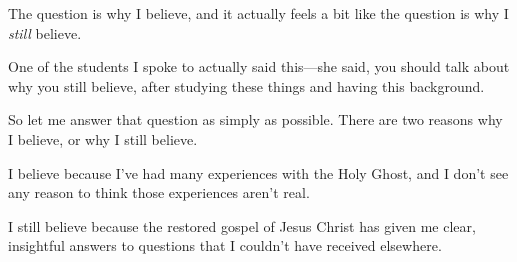 \begin{compactitem}
			\item The question is why I believe, and it actually feels a bit like the question is why I \textit{still} believe.
				\begin{compactitem}
					\item One of the students I spoke to actually said this---she said, you should talk about why you still believe, after studying these things and having this background.
					\item So let me answer that question as simply as possible. There are two reasons why I believe, or why I still believe.
					\item I believe because I've had many experiences with the Holy Ghost, and I don't see any reason to think those experiences aren't real. 
					\item I still believe because the restored gospel of Jesus Christ has given me clear, insightful answers to questions that I couldn't have received elsewhere.
				\end{compactitem}
				

\end{compactitem}
